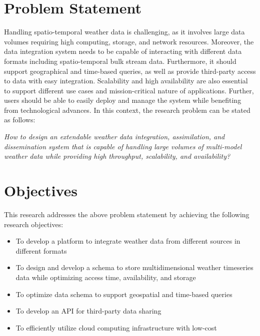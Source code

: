 \section{Problem Statement}
Handling spatio-temporal weather data is challenging, as it involves large data volumes requiring high computing, storage, and network resources. Moreover, the data integration system needs to be capable of interacting with different data formats including spatio-temporal bulk stream data. Furthermore, it should support geographical and time-based queries, as well as provide third-party access to data with easy integration. Scalability and high availability are also essential to support different use cases and mission-critical nature of applications.
Further, users should be able to easily deploy and manage the system while benefiting from technological advances. 
In this context, the research problem can be stated as follows:

\emph{How to design an extendable weather data integration, assimilation, and dissemination system that is capable of handling large volumes of multi-model weather data while providing high throughput, scalability, and availability?}

\section{Objectives}
This research addresses the above problem statement by achieving the following research objectives:
\begin{itemize}
    \item To develop a platform to integrate weather data from different sources in different formats
    \item To design and develop a schema to store multidimensional weather timeseries data while optimizing access time, availability, and storage
    \item To optimize data schema to support geospatial and time-based queries
    \item To develop an API for third-party data sharing
    \item To efficiently utilize cloud computing infrastructure with low-cost
\end{itemize}
